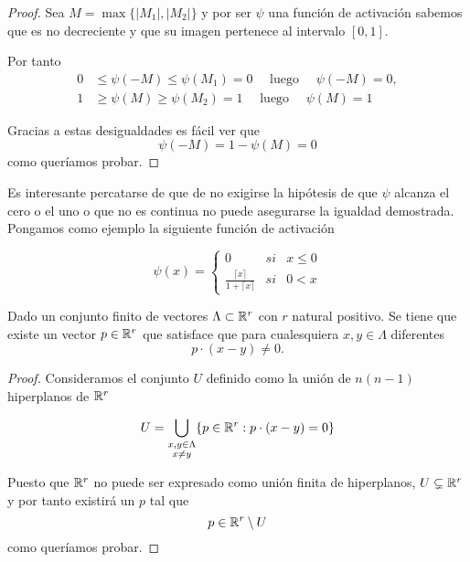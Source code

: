 \begin{proof}
Sea $M = \max \{|M_1|,|M_2|\}$ y por ser $\psi$ una función de activación sabemos que
es no decreciente y que su imagen pertenece al intervalo $[0,1].$

Por tanto
\begin{align}
      0 &\leq \psi(-M) \leq \psi(M_1) = 0 \quad \text{ luego } \quad \psi(-M) = 0, \\
      1 &\geq \psi(M) \geq \psi(M_2) = 1 \quad \text{ luego } \quad\psi(M) = 1
\end{align}

Gracias a estas desigualdades es fácil ver que 
\begin{equation}
    \psi(-M) = 1 - \psi(M) = 0
\end{equation}
como queríamos probar. 
\end{proof}   

Es interesante percatarse de que de no exigirse la hipótesis de 
que $\psi$ alcanza el cero o el uno o que no es continua no puede 
asegurarse la igualdad demostrada. Pongamos como ejemplo la siguiente función de activación

\begin{equation}
    \psi(x)= \left\{ \begin{array}{lcc}
        0 &   si  & x \leq 0 \\
        \frac{\lceil x \rceil}{1+ \lceil x \rceil}&  si & 0< x  
        \end{array}
    \right. 
\end{equation}

\begin{lema}\label{lema:previo_propio_2_al_teorema_2_5}
    Dado un conjunto finito de vectores $\Lambda \subset \mathbb{R}^r$ con 
    $r$ natural positivo. 
    Se tiene que existe un vector $p \in \mathbb{R}^r$ que satisface que 
    para cualesquiera $x,y \in \Lambda$ diferentes 
    \begin{equation}
        p \cdot(x-y) \neq 0.
    \end{equation}
\end{lema}
\begin{proof}
    Consideramos el conjunto $U$ definido como la unión de 
    $n (n-1)$ hiperplanos de $\mathbb{R}^r$

    \begin{equation}
        U = \bigcup_{ 
            \substack{
                x,y \in \Lambda \\
                x \neq y
            }
        }
        \{ 
            p \in \mathbb{R}^r: p \cdot (x-y) = 0
        \}
    \end{equation}

    Puesto que $\mathbb{R}^r$ no puede ser expresado como unión finita de hiperplanos,
    $U \subsetneq \mathbb{R}^r$ y por tanto existirá un $p$ tal que 
    \begin{equation}
        p \in \mathbb{R}^r \setminus U
    \end{equation}
    como queríamos probar. 
\end{proof}

